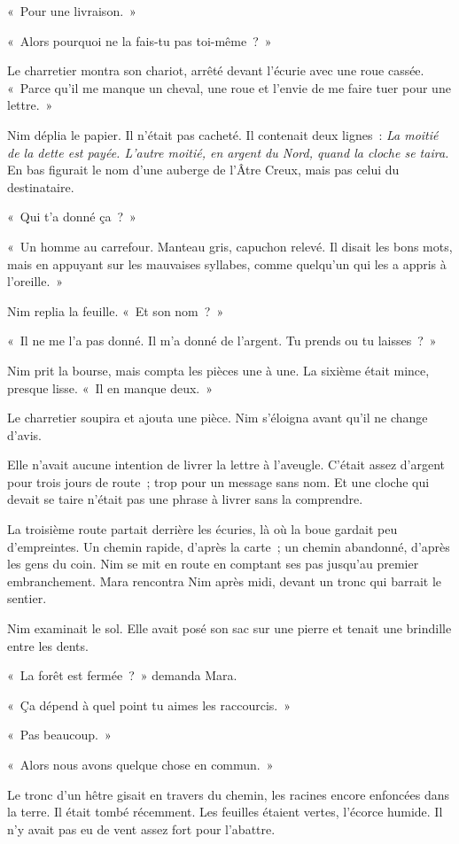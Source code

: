 \documentclass[10pt,a4paper]{article}
\begin{document}
«~Pour une livraison.~»

«~Alors pourquoi ne la fais-tu pas toi-même~?~»

Le charretier montra son chariot, arrêté devant l’écurie avec une roue cassée. «~Parce qu’il me manque un cheval, une roue et l’envie de me faire tuer pour une lettre.~»

Nim déplia le papier. Il n’était pas cacheté. Il contenait deux lignes~: \emph{La moitié de la dette est payée. L’autre moitié, en argent du Nord, quand la cloche se taira.} En bas figurait le nom d’une auberge de l’Âtre Creux, mais pas celui du destinataire.

«~Qui t’a donné ça~?~»

«~Un homme au carrefour. Manteau gris, capuchon relevé. Il disait les bons mots, mais en appuyant sur les mauvaises syllabes, comme quelqu’un qui les a appris à l’oreille.~»

Nim replia la feuille. «~Et son nom~?~»

«~Il ne me l’a pas donné. Il m’a donné de l’argent. Tu prends ou tu laisses~?~»

Nim prit la bourse, mais compta les pièces une à une. La sixième était mince, presque lisse. «~Il en manque deux.~»

Le charretier soupira et ajouta une pièce. Nim s’éloigna avant qu’il ne change d’avis.

Elle n’avait aucune intention de livrer la lettre à l’aveugle. C’était assez d’argent pour trois jours de route~; trop pour un message sans nom. Et une cloche qui devait se taire n’était pas une phrase à livrer sans la comprendre.

La troisième route partait derrière les écuries, là où la boue gardait peu d’empreintes. Un chemin rapide, d’après la carte~; un chemin abandonné, d’après les gens du coin. Nim se mit en route en comptant ses pas jusqu’au premier embranchement.
Mara rencontra Nim après midi, devant un tronc qui barrait le sentier.

Nim examinait le sol. Elle avait posé son sac sur une pierre et tenait une brindille entre les dents.

«~La forêt est fermée~?~» demanda Mara.

«~Ça dépend à quel point tu aimes les raccourcis.~»

«~Pas beaucoup.~»

«~Alors nous avons quelque chose en commun.~»

Le tronc d’un hêtre gisait en travers du chemin, les racines encore enfoncées dans la terre. Il était tombé récemment. Les feuilles étaient vertes, l’écorce humide. Il n’y avait pas eu de vent assez fort pour l’abattre.
\end{document}
